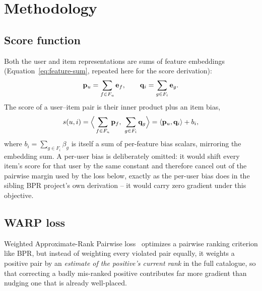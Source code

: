 \section{Methodology}
\label{sec:methodology}

\subsection{Score function}

Both the user and item representations are sums of feature embeddings
(Equation~\ref{eq:feature-sum}, repeated here for the score derivation):
\begin{equation}
  \mathbf{p}_u = \sum_{f \in F_u} \mathbf{e}_f, \qquad
  \mathbf{q}_i = \sum_{g \in F_i} \mathbf{e}_g .
\end{equation}
The score of a user--item pair is their inner product plus an item bias,
\begin{equation}
  s(u, i) = \Big\langle \sum_{f \in F_u} \pvec_f,\ \sum_{g \in F_i} \qvec_g \Big\rangle
          = \langle \pvec_u, \qvec_i \rangle + b_i ,
  \label{eq:score}
\end{equation}
where $b_i = \sum_{g \in F_i} \beta_g$ is itself a sum of per-feature bias
scalars, mirroring the embedding sum. A per-user bias is deliberately
omitted: it would shift every item's score for that user by the same
constant and therefore cancel out of the pairwise margin used by the loss
below, exactly as the per-user bias does in the sibling BPR project's own
derivation -- it would carry zero gradient under this objective.

\subsection{WARP loss}
\label{sec:warp}

Weighted Approximate-Rank Pairwise loss~\cite{weston2011warp,kula2015}
optimizes a pairwise ranking criterion like BPR, but instead of weighting
every violated pair equally, it weights a positive pair by an \emph{estimate
of the positive's current rank} in the full catalogue, so that correcting a
badly mis-ranked positive contributes far more gradient than nudging one
that is already well-placed.

